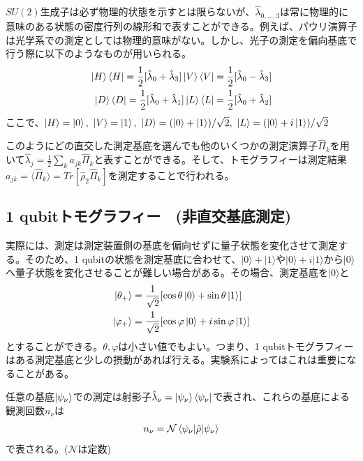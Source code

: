 \documentclass[11pt,a4j,notitlepage]{jreport}
\begin{document}
	$SU(2)$生成子は必ず物理的状態を示すとは限らないが、$\hat{\lambda}_{0,...,3}$は常に物理的に意味のある状態の密度行列の線形和で表すことができる。例えば、パウリ演算子は光学系での測定としては物理的意味がない。しかし、光子の測定を偏向基底で行う際に以下のようなものが用いられる。
	\begin{equation}
		\begin{aligned}
			\ket{H} \bra{H} = \frac{1}{2}[\hat{\lambda}_0 + \hat{\lambda}_3] \ket{V} \bra{V} = \frac{1}{2}[\hat{\lambda}_0 - \hat{\lambda}_3]\\
			\ket{D} \bra{D} = \frac{1}{2}[\hat{\lambda}_0 + \hat{\lambda}_1] \ket{L} \bra{L} = \frac{1}{2}[\hat{\lambda}_0 + \hat{\lambda}_2]
		\end{aligned}
	\end{equation}
	ここで、$\ket{H} = \ket{0}, \ \ket{V} = \ket{1}, \ \ket{D} = (\ket{0} + \ket{1}) / \sqrt{2} , \ \ket{L} = (\ket{0} + i\ket{1}) / \sqrt{2}$

	このようにどの直交した測定基底を選んでも他のいくつかの測定演算子$\hat{\Pi}_k$を用いて$\hat{\lambda}_j = \frac{1}{2} \sum_{k} a_{jk} \hat{\Pi}_k$と表すことができる。そして、トモグラフィーは測定結果$a_{jk} = \langle \hat{\Pi}_k \rangle = Tr[\hat{\rho}_2 \hat{\Pi}_k]$を測定することで行われる。

	\subsection{1 qubitトモグラフィー　(非直交基底測定)}

	実際には、測定は測定装置側の基底を偏向せずに量子状態を変化させて測定する。そのため、1 qubitの状態を測定基底に合わせて、$| 0 \rangle + | 1 \rangle$や$| 0 \rangle + i | 1 \rangle$から$| 0 \rangle$へ量子状態を変化させることが難しい場合がある。その場合、測定基底を$| 0 \rangle$と
	\begin{equation}
		\begin{aligned}
			\ket{\theta_+} &= \frac{1}{\sqrt{2}} [\cos \theta \ket{0} + \sin \theta \ket{1}]\\
			\ket{\varphi_+} &= \frac{1}{\sqrt{2}} [\cos \varphi \ket{0} + i \sin \varphi \ket{1}]
		\end{aligned}
	\end{equation}
	とすることができる。$\theta, \varphi$は小さい値でもよい。つまり、1 qubitトモグラフィーはある測定基底と少しの摂動があれば行える。実験系によってはこれは重要になることがある。

	任意の基底$\ket{\psi_\nu}$での測定は射影子$\hat{\lambda}_\nu = \ket{\psi_\nu} \bra{\psi_\nu}$で表され、これらの基底による観測回数$n_\nu$は
	\begin{equation}
		n_\nu = \mathcal{N} \braket{\psi_\nu | \hat{\rho} | \psi_\nu}
	\end{equation}
	で表される。($\mathcal{N}$は定数)
\end{document}
